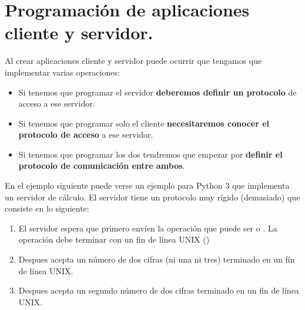\documentclass[a4paper,12pt,spanish]{sphinxmanual}
\begin{document}
\section{Programación de aplicaciones cliente y servidor.}
\label{textos/tema3:programacion-de-aplicaciones-cliente-y-servidor}
Al crear aplicaciones cliente y servidor puede ocurrir que tengamos que implementar varias operaciones:
\begin{itemize}
\item {} 
Si tenemos que programar el servidor \textbf{deberemos definir un protocolo} de acceso a ese servidor.

\item {} 
Si tenemos que programar solo el cliente \textbf{necesitaremos conocer el protocolo de acceso} a ese servidor.

\item {} 
Si tenemos que programar los dos tendremos que empezar por \textbf{definir el protocolo de comunicación entre ambos}.

\end{itemize}

En el ejemplo siguiente puede verse un ejemplo para Python 3 que implementa un servidor de cálculo. El servidor tiene un protocolo muy rígido (demasiado) que consiste en lo siguiente:
\begin{enumerate}
\item {} 
El servidor espera que primero envíen la operación que puede ser \sphinxcode{+} o \sphinxcode{-}. La operación debe terminar con un fin de línea UNIX ()

\item {} 
Despues acepta un número de dos cifras (ni una ni tres) terminado en un fín de línea UNIX.

\item {} 
Despues acepta un segundo número de dos cifras terminado en un fin de línea UNIX.

\end{enumerate}
\end{document}
